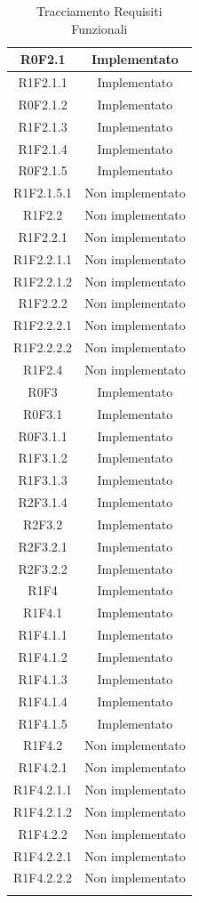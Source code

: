 \begin{longtable}{|c|c|}
	\hline
	R0F2.1 & Implementato\\
	\hline
	R1F2.1.1 & Implementato\\
	\hline
	R0F2.1.2 & Implementato\\
	\hline
	R1F2.1.3 & Implementato\\
	\hline
	R1F2.1.4 & Implementato\\
	\hline
	R0F2.1.5 & Implementato\\
	\hline
	R1F2.1.5.1 & Non implementato\\
	\hline
	R1F2.2 & Non implementato\\
	\hline
	R1F2.2.1 & Non implementato\\
	\hline
	R1F2.2.1.1 & Non implementato\\
	\hline
	R1F2.2.1.2 & Non implementato\\
	\hline
	R1F2.2.2 & Non implementato\\
	\hline
	R1F2.2.2.1 & Non implementato\\
	\hline
	R1F2.2.2.2 & Non implementato\\
	\hline
	R1F2.4 & Non implementato\\
	\hline
	R0F3 & Implementato\\
	\hline
	R0F3.1 & Implementato\\
	\hline
	R0F3.1.1 & Implementato\\
	\hline
	R1F3.1.2 & Implementato\\
	\hline
	R1F3.1.3 & Implementato\\
	\hline
	R2F3.1.4 & Implementato\\
	\hline
	R2F3.2 & Implementato\\
	\hline
	R2F3.2.1 & Implementato\\
	\hline
	R2F3.2.2 & Implementato\\
	\hline
	R1F4 & Implementato\\
	\hline
	R1F4.1 & Implementato\\
	\hline
	R1F4.1.1 & Implementato\\
	\hline
	R1F4.1.2 & Implementato\\
	\hline
	R1F4.1.3 & Implementato\\
	\hline
	R1F4.1.4 & Implementato\\
	\hline
	R1F4.1.5 & Implementato\\
	\hline
	R1F4.2 & Non implementato\\
	\hline
	R1F4.2.1 & Non implementato\\
	\hline
	R1F4.2.1.1 & Non implementato\\
	\hline
	R1F4.2.1.2 & Non implementato\\
	\hline
	R1F4.2.2 & Non implementato\\
	\hline
	R1F4.2.2.1 & Non implementato\\
	\hline
	R1F4.2.2.2 & Non implementato\\
	\hline
	\caption[Tracciamento Requisiti Funzionali]{Tracciamento Requisiti Funzionali}
\end{longtable}

